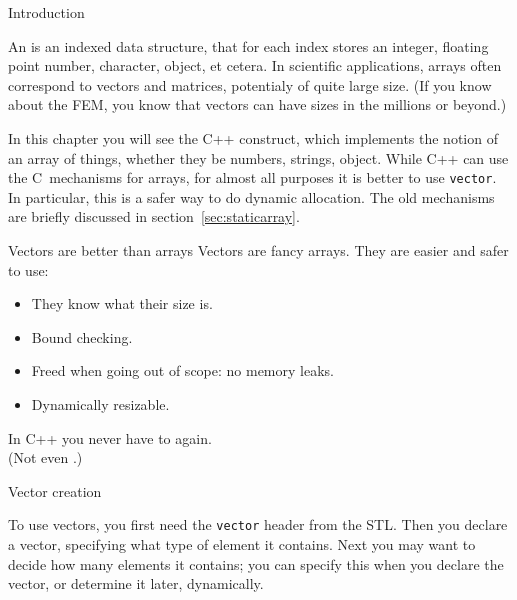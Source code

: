 
 {Introduction}

An  is an indexed data structure, that for each
index stores an integer, floating point number, character,
object, et cetera.
In scientific applications, arrays often correspond to vectors and
matrices, potentialy of quite large size. (If you know about the
\acf{FEM}, you know that vectors can have sizes in the millions or beyond.)

In this chapter you will see the C++  construct,
which implements the notion of an array of things, whether they be
numbers, strings, object.
While C++ can use the C~mechanisms for arrays, for almost all purposes
it is better to use \lstinline{vector}. In particular, this is a safer way to
do dynamic allocation. The old
mechanisms are briefly discussed in section~\ref{sec:staticarray}.

\begin{slide}{Vectors are better than arrays}
  \label{sl:vector-why}
  Vectors are fancy arrays. They are easier and safer to use:
  \begin{itemize}
  \item They know what their size is.
  \item Bound checking.
  \item Freed when going out of scope: no memory leaks.
  \item Dynamically resizable.
  \end{itemize}
  In C++ you never have to  again.\\
  (Not even .)
\end{slide}

 {Vector creation}

To use vectors, you first need the \lstinline{vector} header from the
\ac{STL}. Then you declare a vector, specifying what type of element
it contains. Next you may want to decide how many elements it
contains; you can specify this when you declare the vector, or
determine it later, dynamically.

